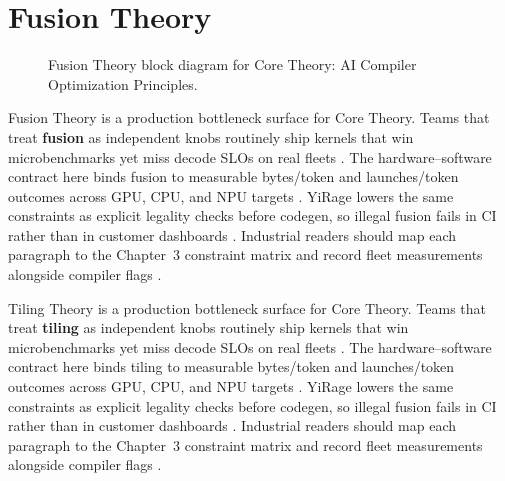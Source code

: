 \section{Fusion Theory}
\label{sec:fusion_theory}
\begin{figure}[t]
\centering
{}
\caption{Fusion Theory block diagram for Core Theory: AI Compiler Optimization Principles.}
\label{fig:fusion_theory_architecture}
\end{figure}


Fusion Theory is a production bottleneck surface for Core Theory. Teams that treat \textbf{fusion} as independent knobs routinely ship kernels that win microbenchmarks yet miss decode SLOs on real fleets \citep{taxbreak2026,semianalysis2024tma}. The hardware--software contract here binds fusion to measurable bytes/token and launches/token outcomes across GPU, CPU, and NPU targets \citep{memoryfloor2026,amd2024xdna}. YiRage lowers the same constraints as explicit legality checks before codegen, so illegal fusion fails in CI rather than in customer dashboards \citep{nvidia2022hopper,amd2024aie}. Industrial readers should map each paragraph to the Chapter~3 constraint matrix and record fleet measurements alongside compiler flags \citep{semianalysis2024tma,dlbook}.

Tiling Theory is a production bottleneck surface for Core Theory. Teams that treat \textbf{tiling} as independent knobs routinely ship kernels that win microbenchmarks yet miss decode SLOs on real fleets \citep{liu2024deepseekv3,memoryfloor2026}. The hardware--software contract here binds tiling to measurable bytes/token and launches/token outcomes across GPU, CPU, and NPU targets \citep{patel2025llminference,nvidia2022hopper}. YiRage lowers the same constraints as explicit legality checks before codegen, so illegal fusion fails in CI rather than in customer dashboards \citep{taxbreak2026,semianalysis2024tma}. Industrial readers should map each paragraph to the Chapter~3 constraint matrix and record fleet measurements alongside compiler flags \citep{memoryfloor2026,amd2024xdna}.

